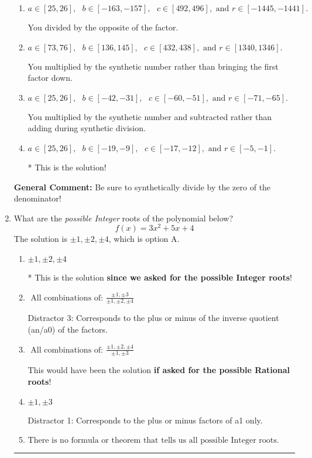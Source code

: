 \documentclass{extbook}[14pt]
\newcommand{\litem}[1]{\item #1

\rule{\textwidth}{0.4pt}}
\begin{document}
\begin{enumerate}
{\begin{enumerate}[label=\Alph*.]
 You divided by the opposite of the factor AND multiplied the first factor rather than just bringing it down.
\item \( a \in [25, 26], \text{   } b \in [-163, -157], \text{   } c \in [492, 496], \text{   and   } r \in [-1445, -1441]. \)

 You divided by the opposite of the factor.
\item \( a \in [73, 76], \text{   } b \in [136, 145], \text{   } c \in [432, 438], \text{   and   } r \in [1340, 1346]. \)

 You multiplied by the synthetic number rather than bringing the first factor down.
\item \( a \in [25, 26], \text{   } b \in [-42, -31], \text{   } c \in [-60, -51], \text{   and   } r \in [-71, -65]. \)

 You multiplied by the synthetic number and subtracted rather than adding during synthetic division.
\item \( a \in [25, 26], \text{   } b \in [-19, -9], \text{   } c \in [-17, -12], \text{   and   } r \in [-5, -1]. \)

* This is the solution!
\end{enumerate}

\textbf{General Comment:} Be sure to synthetically divide by the zero of the denominator!
}
\litem{
What are the \textit{possible Integer} roots of the polynomial below?
\[ f(x) = 3x^{2} +5 x + 4 \]The solution is \( \pm 1,\pm 2,\pm 4 \), which is option A.\begin{enumerate}[label=\Alph*.]
\item \( \pm 1,\pm 2,\pm 4 \)

* This is the solution \textbf{since we asked for the possible Integer roots}!
\item \( \text{ All combinations of: }\frac{\pm 1,\pm 3}{\pm 1,\pm 2,\pm 4} \)

 Distractor 3: Corresponds to the plus or minus of the inverse quotient (an/a0) of the factors. 
\item \( \text{ All combinations of: }\frac{\pm 1,\pm 2,\pm 4}{\pm 1,\pm 3} \)

This would have been the solution \textbf{if asked for the possible Rational roots}!
\item \( \pm 1,\pm 3 \)

 Distractor 1: Corresponds to the plus or minus factors of a1 only.
\item \( \text{There is no formula or theorem that tells us all possible Integer roots.} \)


\end{enumerate}}
\end{enumerate}
\end{document}
